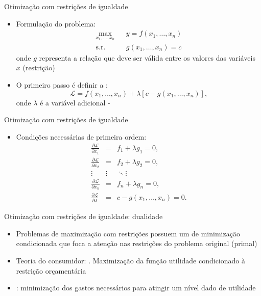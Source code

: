 \documentclass[10pt]{beamer}
\begin{document}
\begin{frame}
    {Otimização com restrições de igualdade}
    \begin{itemize}
        \item Formulação do problema:
        \begin{eqnarray*}
          \max_{x_1, \dots, x_n} & & y = f(x_1, \dots, x_n)  \\
            \text{s.r.} & & g(x_1, \dots, x_n) = c
        \end{eqnarray*}
        onde $g$ representa a relação que deve ser válida entre os valores das variáveis $x$ (restrição) \bigskip
        \item O primeiro passo é definir a :
        \[
          \mathcal{L} = f(x_1, \dots, x_n) + \lambda [c - g(x_1, \dots, x_n)],  
        \]
        onde $\lambda$ é a variável adicional - 
    \end{itemize}
\end{frame}

\begin{frame}
    {Otimização com restrições de igualdade}
    \begin{itemize}
        \item Condições necessárias de primeira ordem:
        \begin{eqnarray*}
            \frac{\partial \mathcal{L}}{\partial x_1} &=& f_1 + \lambda g_1 = 0, \\
            \frac{\partial \mathcal{L}}{\partial x_2} &=& f_2 + \lambda g_2 = 0, \\
            \vdots & \vdots & \ddots \vdots \\
            \frac{\partial \mathcal{L}}{\partial x_n} &=& f_n + \lambda g_n = 0, \\
            \frac{\partial \mathcal{L}}{\partial \lambda} &=& c - g(x_1, \dots, x_n) = 0.
        \end{eqnarray*}
    \end{itemize}
\end{frame}

\begin{frame}
    {Otimização com restrições de igualdade: dualidade}
    \begin{itemize}
        \item Problemas de maximização com restrições possuem um  de minimização condicionada que foca a atenção nas restrições do problema original (primal)\bigskip
        \item Teoria do consumidor: . Maximização da função utilidade condicionado à restrição orçamentária\bigskip
        \item {}: minimização dos gastos necessários para atingir um nível dado de utilidade
    \end{itemize}
\end{frame}
\end{document}
